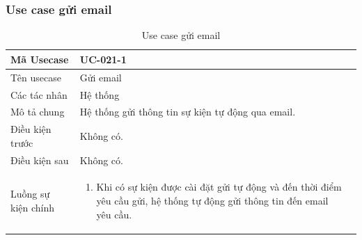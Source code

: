 \documentclass[12pt,a4paper]{article}
\begin{document}
    \subsubsection*{Use case gửi email}
    \begin{table}[H]
        \centering
        \begin{tabular}{|p{3.5cm}|p{11.5cm}|c|}
            \hline
            Mã Usecase      & UC-021-1                                          \\
            \hline
            Tên usecase     & Gửi email                                         \\
            \hline
            Các tác nhân    & Hệ thống                                          \\
            \hline
            Mô tả chung     & Hệ thống gửi thông tin sự kiện tự động qua email. \\
            \hline

            Điều kiện trước & Không có.                                         \\
            \hline

            Điều kiện sau   & Không có.                                         \\
            \hline

            Luồng sự kiện chính & \vspace{-.8cm}\begin{enumerate}
                                                    \item Khi có sự kiện được cài đặt gửi tự động và đến thời điểm yêu cầu gửi, hệ thống tự động gửi thông tin đến email yêu cầu.
            \end{enumerate}
            \\
            \hline
        \end{tabular}
        \caption{Use case gửi email}

    \end{table}


\end{document}
